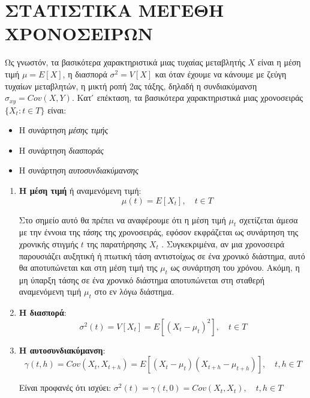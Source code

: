 \section{ΣΤΑΤΙΣΤΙΚΑ ΜΕΓΕΘΗ ΧΡΟΝΟΣΕΙΡΩΝ }
Ως γνωστόν, τα βασικότερα χαρακτηριστικά μιας τυχαίας μεταβλητής $ X $ είναι η
μέση τιμή $\mu = E \left[  X \right]  $, η διασπορά $ \sigma^2 = V \left[  X \right] $ και όταν έχουμε να κάνουμε με ζεύγη
τυχαίων μεταβλητών, η μικτή ροπή 2ας τάξης, δηλαδή η συνδιακύμανση
$\sigma_{xy} = Cov \left(  X , Y \right)  $. Κατ ́ επέκταση, τα βασικότερα χαρακτηριστικά μιας χρονοσειράς
$ \{ X_t : t \in T \}$ είναι:\\
\begin{itemize}
\item H συνάρτηση \textit{μέσης τιμής}
\item Η συνάρτηση \textit{διασποράς}
\item Η συνάρτηση \textit{αυτοσυνδιακύμανσης}

\end{itemize}
\begin{enumerate}


\item \textbf{Η μέση τιμή } ή αναμενόμενη τιμή:\\ $$\quad \mu\left( t  \right) = E\left[ X_t \right], \quad t \in T $$

Στο σημείο αυτό θα πρέπει να αναφέρουμε ότι η μέση τιμή $\mu_t$ σχετίζεται άμεσα
με την έννοια της \textit{τάσης} της χρονοσειράς, εφόσον εκφράζεται ως συνάρτηση της
χρονικής στιγμής $t$ της παρατήρησης $X_t$ . Συγκεκριμένα, αν μια χρονοσειρά παρουσιάζει
αυξητική ή πτωτική τάση αντιστοίχως σε ένα χρονικό διάστημα, αυτό θα αποτυπώνεται
και στη μέση τιμή της $\mu_t$ ως συνάρτηση του χρόνου. Ακόμη, η μη ύπαρξη τάσης σε ένα
χρονικό διάστημα αποτυπώνεται στη σταθερή αναμενόμενη τιμή $\mu_t$ στο εν λόγω
διάστημα.

\item \textbf{Η διασπορά}:\\ $$\sigma^2\left( t \right) =V \left[X_t \right] = E\left[\left( X_t-\mu_t\right) ^2  \right], \quad t \in T    $$

\item \textbf{Η αυτοσυνδιακύμανση}:\\
$$ \gamma\left(t,h \right) = Cov\left(X_t,X_{t+h} \right) =E\left[ \left(X_t-\mu_t \right)\left( X_{t+h}-\mu_{t+h}\right)  \right], \quad t,h \in T   $$ 

Είναι προφανές ότι ισχύει: 
$\sigma^2\left( t \right)=\gamma\left( t,0\right) =Cov\left(X_t,X_t \right),\quad t,h \in T   $ 


\end{enumerate}

